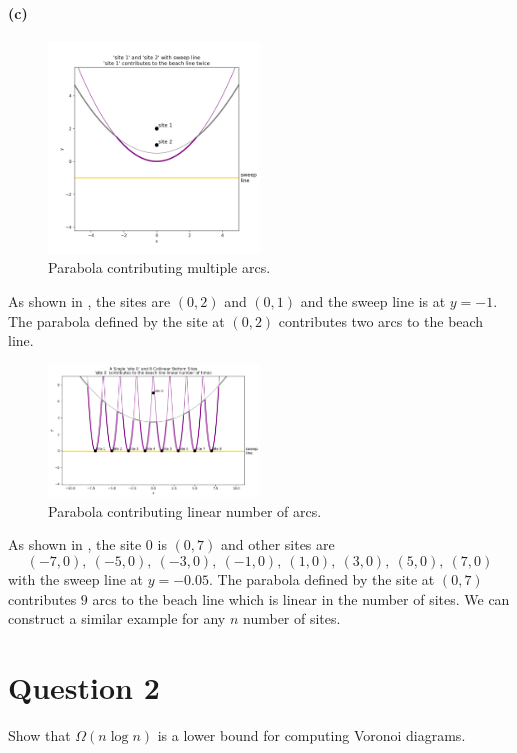 \documentclass[12pt]{article}
\begin{document}
\paragraph{(c)}
\begin{figure}[H]
    \centering
    \includegraphics[width=0.5\textwidth]{img/1c_1.png}
    \caption{Parabola contributing multiple arcs.}
    \label{fig:1c_parabola}
\end{figure}
As shown in , the sites are \((0,2)\) and \((0,1)\) and the sweep line is at \(y=-1\). The parabola defined by the site at \((0,2)\) contributes two arcs to the beach line.

\begin{figure}[H]
    \centering
    \includegraphics[width=0.5\textwidth]{img/1c_2.png}
    \caption{Parabola contributing linear number of arcs.}
    \label{fig:1c_linear_arcs}
\end{figure}
As shown in , the site 0 is \((0,7)\) and other sites are 
\[
(-7,0),\ (-5,0),\ (-3,0),\ (-1,0),\ (1,0),\ (3,0),\ (5,0),\ (7,0)
\]
with the sweep line at \(y=-0.05\). The parabola defined by the site at \((0,7)\) contributes \(9\) arcs to the beach line which is linear in the number of sites. We can construct a similar example for any \(n\) number of sites.
 

\section*{Question 2}
Show that $\Omega(n \log n)$ is a lower bound for computing Voronoi diagrams.
\end{document}
